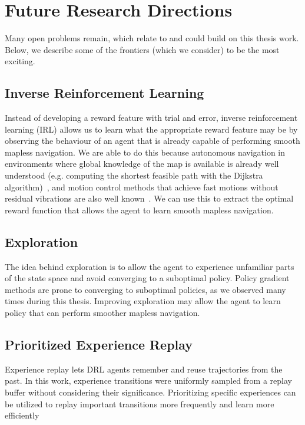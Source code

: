 \section{Future Research Directions}
\label{concl:sec:directions}
Many open problems remain, which relate to and could build on this thesis work. Below, we describe some of the frontiers (which we consider) to be the most exciting.

\subsection{Inverse Reinforcement Learning}
Instead of developing a reward feature with trial and error, inverse reinforcement learning (IRL) allows us to learn what the appropriate reward feature may be by observing the behaviour of an agent that is already capable of performing smooth mapless navigation. We are able to do this because autonomous navigation in environments where global knowledge of the map is available is already well understood (e.g. computing the shortest feasible path with the Dijkstra algorithm)~\cite{lavalle_planning_2006}, and motion control methods that achieve fast motions without residual vibrations are also well known~\cite{meckl_optimized_1998}. We can use this to extract the optimal reward function that allows the agent to learn smooth mapless navigation.

\subsection{Exploration}
The idea behind exploration is to allow the agent to experience unfamiliar parts of the state space and avoid converging to a suboptimal policy. Policy gradient methods are prone to converging to suboptimal policies, as we observed many times during this thesis. Improving exploration may allow the agent to learn policy that can perform smoother mapless navigation.

\subsection{Prioritized Experience Replay}
Experience replay lets DRL agents remember and reuse trajectories from the past. In this work, experience transitions were uniformly sampled from a replay buffer without considering their significance. Prioritizing specific experiences can be utilized to replay important transitions more frequently and learn more efficiently~\cite{schaul_prioritized_2016}

